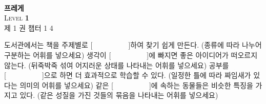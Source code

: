 \documentclass[fs11,seriesFre]{korfarm-base}
\begin{document}
\thispagestyle{kfBlank}
\kfBookCoverBg
\vspace*{\kfBookCoverVspace}
\begin{center}
{\kfLogoLg}\\[14pt]
{\fontsize{72}{84}\selectfont\bfseries\kfBookCoverColor 프레게}\\[18pt]
{\fontsize{28}{32}\selectfont\kfBookCoverSubColor \textsc{Level} \textbf{1}}\\[22pt]
{\large\kfBookCoverSubColor 제 1 권 \quad\textbar\quad 챕터 1\textendash{} 4}
\end{center}
\vfill
\hfill\kfSeriesBadge\hspace{15mm}
\clearpage
{}
\begin{kfChapterAreaList}
\end{kfChapterAreaList}



\kfActivityBg \par{}\par\nopagebreak[4]\smallskip\nopagebreak[4]
\begin{kfBlankList}
\kfBlankItem 도서관에서는 책을 주제별로 [　　　　　]하여 찾기 쉽게 만든다. (종류에 따라 나누어 구분하는 어휘를 넣으세요)
\kfBlankItem 생각이 [　　　　　]에 빠지면 좋은 아이디어가 떠오르지 않는다. (뒤죽박죽 섞여 어지러운 상태를 나타내는 어휘를 넣으세요)
\kfBlankItem 공부를 [　　　　　]으로 하면 더 효과적으로 학습할 수 있다. (일정한 틀에 따라 짜임새가 있다는 의미의 어휘를 넣으세요)
\kfBlankItem 같은 [　　　　　]에 속하는 동물들은 비슷한 특징을 가지고 있다. (같은 성질을 가진 것들의 묶음을 나타내는 어휘를 넣으세요)
\end{kfBlankList}

\end{document}
